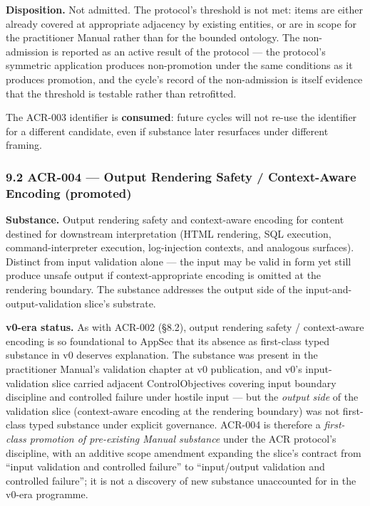 \documentclass[
]{article}
\begin{document}
\textbf{Disposition.} Not admitted. The protocol's threshold is not met:
items are either already covered at appropriate adjacency by existing
entities, or are in scope for the practitioner Manual rather than for
the bounded ontology. The non-admission is reported as an active result
of the protocol --- the protocol's symmetric application produces
non-promotion under the same conditions as it produces promotion, and
the cycle's record of the non-admission is itself evidence that the
threshold is testable rather than retrofitted.

The ACR-003 identifier is \textbf{consumed}: future cycles will not
re-use the identifier for a different candidate, even if substance later
resurfaces under different framing.

\subsubsection{9.2 ACR-004 --- Output Rendering Safety / Context-Aware
Encoding
(promoted)}\label{acr-004-output-rendering-safety-context-aware-encoding-promoted}

\textbf{Substance.} Output rendering safety and context-aware encoding
for content destined for downstream interpretation (HTML rendering, SQL
execution, command-interpreter execution, log-injection contexts, and
analogous surfaces). Distinct from input validation alone --- the input
may be valid in form yet still produce unsafe output if
context-appropriate encoding is omitted at the rendering boundary. The
substance addresses the output side of the input-and-output-validation
slice's substrate.

\textbf{v0-era status.} As with ACR-002 (§8.2), output rendering safety
/ context-aware encoding is so foundational to AppSec that its absence
as first-class typed substance in v0 deserves explanation. The substance
was present in the practitioner Manual's validation chapter at v0
publication, and v0's input-validation slice carried adjacent
ControlObjectives covering input boundary discipline and controlled
failure under hostile input --- but the \emph{output side} of the
validation slice (context-aware encoding at the rendering boundary) was
not first-class typed substance under explicit governance. ACR-004 is
therefore a \emph{first-class promotion of pre-existing Manual
substance} under the ACR protocol's discipline, with an additive scope
amendment expanding the slice's contract from ``input validation and
controlled failure'' to ``input/output validation and controlled
failure''; it is not a discovery of new substance unaccounted for in the
v0-era programme.
\end{document}
